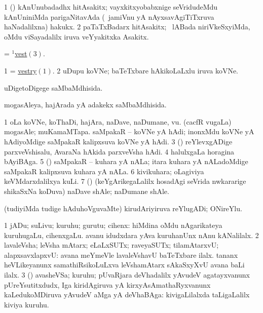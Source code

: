 \bentry
{} 
\gl{\nA}
\expl{}
\bmng
\bnum
\num{1} (\nAyxshA) kAnUnubadadhx hitAsakitx; vayxkitxyobabxnige seVridudeMdu kAnUniniMda parigaNitavAda (\sA\ jamiVnu yA nAyxsavAgiTiTxruva haNadalilxna) hakukx. 
\num{2} paTaTxBadarx hitAsakitx; \sA\ lABada niriVkeSxyiMda, oMdu viSayadalilx iruva veYyakitxka Asakitx. 
\enum
\emng
\eentry

\bentry
{} 
\gl{\nA}
\expl{}
\bmng
 = \hyperlink{vest(1)3}{$^1$vest\((3)\)}. 
\emng
\eentry

\bentry
{} 
\gl{\nA}
\bmng
\bnum
\num{1} = \hyperlink{vestry}{vestry\((1)\)}. 
\num{2} uDupu koVNe; baTeTxbare hAkikoLaLxlu iruva koVNe. 
\enum
\emng
\eentry

\bentry
{} 
\gl{\gu}
\expl{}
\bmng
 uDigetoDigege saMbaMdhisida. 
\emng
\eentry

\bentry
{} 
\gl{\gu}
\expl{}
\bmng
 mogasAleya, hajArada yA adakekx saMbaMdhisida. 
\emng
\eentry

\bentry
{} 
\gl{\nA}
\expl{}
\bmng
\bnum
\num{1} oLa koVNe, koThaDi, hajAra, naDave, naDumane, \mo vu. 
\banum
{} (cacfR \mo vugaLa) mogasAle; muKamaMTapa. 
 saMpakaR -- koVNe yA hAdi; inonxMdu koVNe yA hAdiyoMdige saMpakaR kalipxsuva koVNe yA hAdi. 
\eanum
\numie
\num{3} (\ame) reYlevxgADige parxveVshisalu, AvaraNa hAkida parxveVsha hAdi. 
\num{4} halulxgaLa horagina bAyiBAga. 
\num{5} (\aMrashA) saMpakaR -- kuhara yA nALa; itara kuhara yA nALadoMdige saMpakaR kalipxsuva kuhara yA nALa. 
\num{6} kivikuhara; oLagiviya keVMdarxdalilxya kuLi. 
\num{7} (\ame) (keYgArikegaLalilx hosadAgi seVrida nwkararige shikaSxNa koDuva) naDave shAle; naDumane shAle. 
\enum
\emng
\eentry

\bentry
{} 
\gl{\nA}
\expl{}
\bmng
 (tudiyiMda tudige hAduhoVguvaMte) kirudAriyiruva reYlugADi; ONireYlu. 
\emng
\eentry

\bentry
{} 
\gl{\nA}
\expl{}
\bmng
\bnum
\num{1} jADu; suLivu; kuruhu; gurutu; cihenx:  hiMdina oMdu nAgarikateya kuruhugaLu, cihenxgaLu.  avanu idudxdara yAva kuruhanUnx nAnu kANalilalx. 
\num{2} lavaleVsha; leVsha mAtarx; eLaLxSUTx; raveyaSUTx; tilamAtarxvU; alapxsavxlapxvU:  avana meYmeVle lavaleVshavU baTeTxbare ilalx.  tananx heVLikeyanunx samathiRsikoLuLxva leVshamAtarx sAkaSxyXvU avana baLi ilalx. 
\num{3} (\jiVvi) avasheVSa; kuruhu; pUvaRjara deVhadalilx yAvudeV agatayxvanunx pUreYsutitxdudx, Iga kiridAgiruva yA kirxyAsAmathaRyxvanunx kaLedukoMDiruva yAvudeV aMga yA deVhaBAga:  kivigaLilalxda taLigaLalilx kiviya kuruhu. 
\enum
\emng
\eentry

